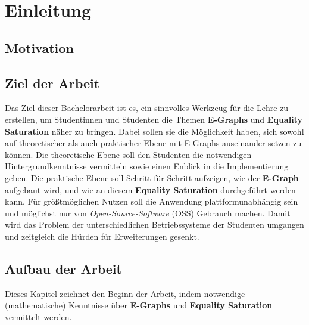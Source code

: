 \section{Einleitung}

\subsection{Motivation}


\subsection{Ziel der Arbeit}

Das Ziel dieser Bachelorarbeit ist es, ein sinnvolles Werkzeug für die Lehre zu erstellen,
um Studentinnen und Studenten die Themen \textbf{E-Graphs} und \textbf{Equality Saturation} näher zu bringen.
Dabei sollen sie die Möglichkeit haben, sich sowohl auf theoretischer als auch praktischer Ebene mit E-Graphs auseinander setzen zu können.
Die theoretische Ebene soll den Studenten die notwendigen Hintergrundkenntnisse vermitteln sowie einen Enblick in die Implementierung geben.
Die praktische Ebene soll Schritt für Schritt aufzeigen, wie der \textbf{E-Graph} aufgebaut wird, und wie an diesem \textbf{Equality Saturation} durchgeführt werden kann.
Für grö{\ss}tmöglichen Nutzen soll die Anwendung plattformunabhängig sein und möglichst nur von \textit{Open-Source-Software} (OSS) Gebrauch machen.
Damit wird das Problem der unterschiedlichen Betriebssysteme der Studenten umgangen und zeitgleich die Hürden für Erweiterungen gesenkt.

\subsection{Aufbau der Arbeit}


Dieses Kapitel zeichnet den Beginn der Arbeit, indem notwendige (mathematische) Kenntnisse über \textbf{E-Graphs} und \textbf{Equality Saturation} vermittelt werden.




